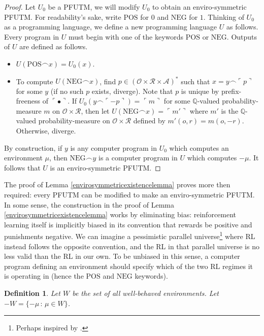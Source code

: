 \documentclass{article}
\newtheorem{definition}[theorem]{Definition}
\begin{document}
\begin{proof}
    Let $U_0$ be a PFUTM, we will modify $U_0$ to obtain an enviro-symmetric PFUTM.
    For readability's sake, write $\mathrm{POS}$ for $0$ and $\mathrm{NEG}$ for $1$.
    Thinking of $U_0$ as a programming language, we define a new programming language
    $U$ as follows. Every program in $U$ must begin with one of the keywords
    $\mathrm{POS}$ or $\mathrm{NEG}$. Outputs of $U$ are defined as follows.
    \begin{itemize}
        \item $U(\mathrm{POS}\frown x)=U_0(x)$.
        \item To compute $U(\mathrm{NEG}\frown x)$, find
        $p\in (\mathcal O\times \mathcal R\times\mathcal A)^*$ such that
        $x=y\frown \ulcorner p\urcorner$ for some $y$ (if no such $p$ exists, diverge).
        Note that $p$ is unique by prefix-freeness of $\ulcorner\bullet\urcorner$.
        If $U_0(y\frown \ulcorner -p\urcorner)=\ulcorner m\urcorner$
        for some $\mathbb Q$-valued probability-measure $m$ on
        $\mathcal O\times\mathcal R$, then let
        $U(\mathrm{NEG}\frown x)=\ulcorner m'\urcorner$ where $m'$
        is the $\mathbb Q$-valued probability-measure on
        $\mathcal O\times\mathcal R$ defined by $m'(o,r)=m(o,-r)$.
        Otherwise, diverge.
    \end{itemize}
    By construction, if $y$ is any computer program in $U_0$ which computes
    an environment $\mu$, then $\mathrm{NEG}\frown y$ is a computer program in
    $U$ which computes $-\mu$. It follows that $U$ is an enviro-symmetric
    PFUTM.
\end{proof}

The proof of Lemma \ref{envirosymmetricexistencelemma} proves more then required:
every PFUTM can be modified to make an enviro-symmetric PFUTM. In some sense,
the construction in the proof of Lemma \ref{envirosymmetricexistencelemma} works
by eliminating bias: reinforcement learning itself is implicitly biased in its
convention that rewards be positive and punishments negative. We can imagine
a pessimistic parallel universe\footnote{Perhaps inspired by \cite{foucault2012discipline}.}
where RL instead follows the opposite convention, and the
RL in that parallel universe is no less valid than the RL in our own. To be
unbiased in this sense, a computer program defining an environment
should specify which of the two RL regimes it is operating in (hence the
$\mathrm{POS}$ and $\mathrm{NEG}$ keywords).

\begin{definition}
    Let $W$ be the set of all well-behaved environments.
    Let $-W=\{-\mu\,:\,\mu\in W\}$.
\end{definition}
\end{document}

